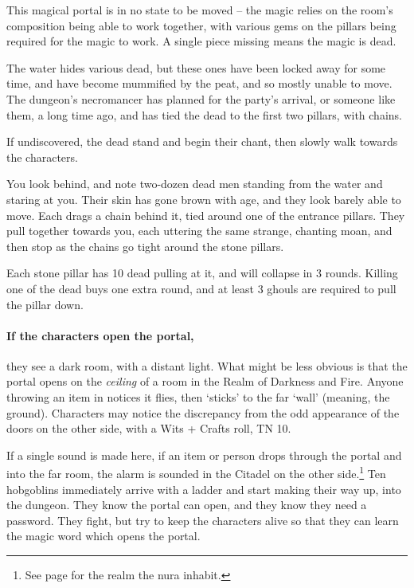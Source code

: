\begin{multicols}{2}
\begin{boxtext}
\end{boxtext}

This magical portal is in no state to be moved -- the magic relies on the room's composition being able to work together, with various gems on the pillars being required for the magic to work.
A single piece missing means the magic is dead.

The water hides various dead, but these ones have been locked away for some time, and have become mummified by the peat, and so mostly unable to move.  The dungeon's necromancer has planned for the party's arrival, or someone like them, a long time ago, and has tied the dead to the first two pillars, with chains.

If undiscovered, the dead stand and begin their chant, then slowly walk towards the characters.

\begin{boxtext}

	You look behind, and note two-dozen dead men standing from the water and staring at you.
	Their skin has gone brown with age, and they look barely able to move.
	Each drags a chain behind it, tied around one of the entrance pillars.
	They pull together towards you, each uttering the same strange, chanting moan, and then stop as the chains go tight around the stone pillars.

\end{boxtext}

Each stone pillar has 10 dead pulling at it, and will collapse in 3 rounds.  Killing one of the dead buys one extra round, and at least 3 ghouls are required to pull the pillar down.

\paragraph{If the characters open the portal,}
they see a dark room, with a distant light.
What might be less obvious is that the portal opens on the \emph{ceiling} of a room in the Realm of Darkness and Fire.
Anyone throwing an item in notices it flies, then `sticks' to the far `wall' (meaning, the ground).
Characters may notice the discrepancy from the odd appearance of the doors on the other side, with a Wits + Crafts roll, TN 10.

If a single sound is made here, if an item or person drops through the portal and into the far room, the alarm is sounded in the Citadel on the other side.\footnote{See page \pageref{darknessandfire} for the realm the nura inhabit.}
Ten hobgoblins immediately arrive with a ladder and start making their way up, into the dungeon.
They know the portal can open, and they know they need a password.
They fight, but try to keep the characters alive so that they can learn the magic word which opens the portal.


\end{multicols}
